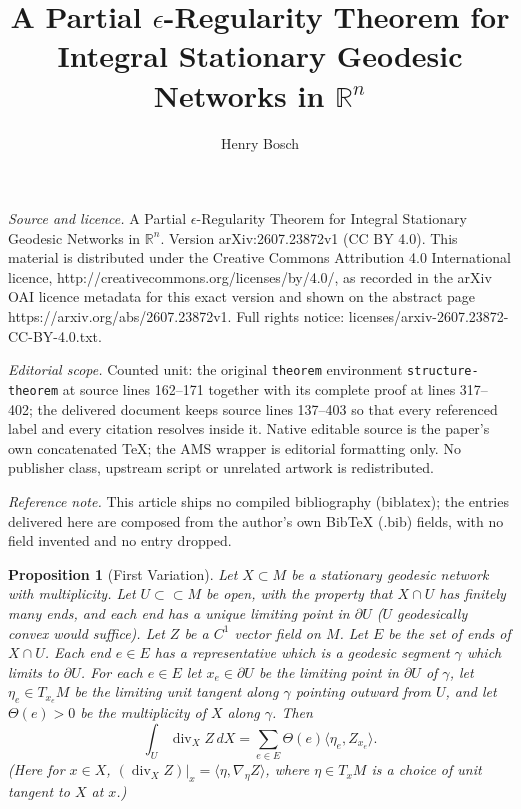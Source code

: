 \documentclass[10pt,a4paper]{amsart}
\newcommand{\on}{\operatorname}
\newcommand{\divv}{\on{div}}
\newcommand{\dee}{\partial}
\newtheorem{proposition}[lemma]{Proposition}
\begin{document}
\title[A Partial epsilon-Regularity Theorem for Integral Stationary]{A Partial $\epsilon$-Regularity Theorem for Integral Stationary Geodesic Networks in $\mathbb{R}^n$}
\author{Henry Bosch}
\date{}
\maketitle
\noindent\emph{Source and licence.} A Partial $\epsilon$-Regularity Theorem for Integral Stationary Geodesic Networks in $\mathbb{R}^n$. Version arXiv:2607.23872v1 (CC BY 4.0). This material is distributed under the Creative Commons Attribution 4.0 International licence, http://creativecommons.org/licenses/by/4.0/, as recorded in the arXiv OAI licence metadata for this exact version and shown on the abstract page https://arxiv.org/abs/2607.23872v1. Full rights notice: licenses/arxiv-2607.23872-CC-BY-4.0.txt.\par\smallskip
\noindent\textit{Editorial scope.} Counted unit: the original \texttt{theorem} environment \texttt{structure-theorem} at source lines 162--171 together with its complete proof at lines 317--402; the delivered document keeps source lines 137--403 so that every referenced label and every citation resolves inside it. Native editable source is the paper's own concatenated TeX; the AMS wrapper is editorial formatting only. No publisher class, upstream script or unrelated artwork is redistributed.
\par\smallskip\noindent\textit{Reference note.} This article ships no compiled bibliography (biblatex); the entries delivered here are composed from the author's own BibTeX (.bib) fields, with no field invented and no entry dropped.
\begin{proposition}[First Variation] \label{first-variation}
Let $X \subset M$ be a stationary geodesic network with multiplicity. Let $U \subset\subset M$ be open, with the property that $X \cap U$ has finitely many ends, and each end has a unique limiting point in $\partial U$ ($U$ geodesically convex would suffice).
Let $Z$ be a $C^1$ vector field on $M$. Let $E$ be the set of ends of $X \cap U$. Each end $e \in E$ has a representative which is a geodesic segment $\gamma$ which limits to $\dee U$. For each $e \in E$ let $x_e \in \partial U$ be the limiting point in $\partial U$ of $\gamma$, let $\eta_e \in T_{x_e}M$ be the limiting unit tangent along $\gamma$ pointing outward from $U$, and let $\Theta(e) > 0$ be the multiplicity of $X$ along $\gamma$. Then
\[\int_U \divv_X Z \, dX = \sum_{e \in E} \Theta(e) \langle \eta_e, Z_{x_e}\rangle.\]
(Here for $x \in X$, $(\divv_X Z)|_x = \langle\eta, \nabla_\eta Z\rangle$, where $\eta \in T_xM$ is a choice of unit tangent to $X$ at $x$.)

\end{proposition}
\end{document}
